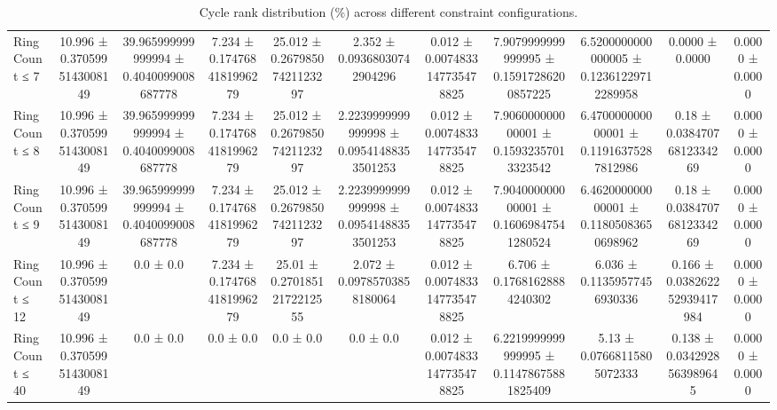 \begin{table}[H]
\begin{tabular}{l c c c c c c c c c c}
        Ring Count ≤ 7 & 10.996 ± 0.3705995143008149 & 39.965999999999994 ± 0.4040099008687778 & 7.234 ± 0.1747684181996279 & 25.012 ± 0.26798507421123297 & 2.352 ± 0.09368030742904296 & 0.012 ± 0.0074833147735478825 & 7.9079999999999995 ± 0.15917286200857225 & 6.5200000000000005 ± 0.12361229712289958 & 0.0000 ± 0.0000 & 0.0000 ± 0.0000 \\
        Ring Count ≤ 8 & 10.996 ± 0.3705995143008149 & 39.965999999999994 ± 0.4040099008687778 & 7.234 ± 0.1747684181996279 & 25.012 ± 0.26798507421123297 & 2.2239999999999998 ± 0.09541488353501253 & 0.012 ± 0.0074833147735478825 & 7.906000000000001 ± 0.15932357013323542 & 6.470000000000001 ± 0.11916375287812986 & 0.18 ± 0.03847076812334269 & 0.0000 ± 0.0000 \\
        Ring Count ≤ 9 & 10.996 ± 0.3705995143008149 & 39.965999999999994 ± 0.4040099008687778 & 7.234 ± 0.1747684181996279 & 25.012 ± 0.26798507421123297 & 2.2239999999999998 ± 0.09541488353501253 & 0.012 ± 0.0074833147735478825 & 7.904000000000001 ± 0.16069847541280524 & 6.462000000000001 ± 0.11805083650698962 & 0.18 ± 0.03847076812334269 & 0.0000 ± 0.0000 \\
        Ring Count ≤ 12 & 10.996 ± 0.3705995143008149 & 0.0 ± 0.0 & 7.234 ± 0.1747684181996279 & 25.01 ± 0.27018512172212555 & 2.072 ± 0.09785703858180064 & 0.012 ± 0.0074833147735478825 & 6.706 ± 0.17681628884240302 & 6.036 ± 0.11359577456930336 & 0.166 ± 0.038262252939417984 & 0.0000 ± 0.0000 \\
        Ring Count ≤ 40 & 10.996 ± 0.3705995143008149 & 0.0 ± 0.0 & 0.0 ± 0.0 & 0.0 ± 0.0 & 0.0 ± 0.0 & 0.012 ± 0.0074833147735478825 & 6.2219999999999995 ± 0.11478675881825409 & 5.13 ± 0.07668115805072333 & 0.138 ± 0.0342928563989645 & 0.0000 ± 0.0000 \\
        \bottomrule
    \end{tabular}
    \caption{Cycle rank distribution (\%) across different constraint configurations.}
\end{table}

